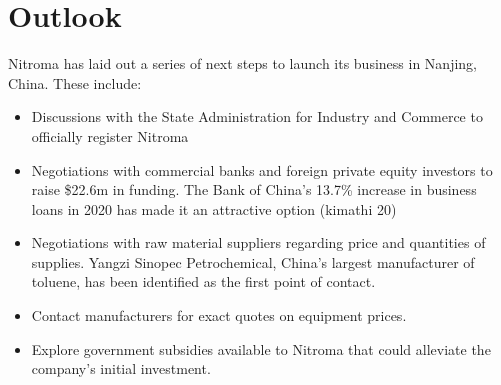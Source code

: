\section{Outlook}
Nitroma has laid out a series of next steps to launch its business in Nanjing, China. These include:
\begin{itemize}
    \item Discussions with the State Administration for Industry and Commerce to officially register Nitroma 
    \item Negotiations with commercial banks and foreign private equity investors to raise \$22.6m in funding. The Bank of China’s 13.7\% increase in business loans in 2020 has made it an attractive option (kimathi 20)
    \item Negotiations with raw material suppliers regarding price and quantities of supplies. Yangzi Sinopec Petrochemical, China’s largest manufacturer of toluene, has been identified as the first point of contact\cite{sinopec_group_sinopec_2014}.
    \item Contact manufacturers for exact quotes on equipment prices.
    \item Explore government subsidies available to Nitroma that could alleviate the company’s initial investment. 
\end{itemize}




